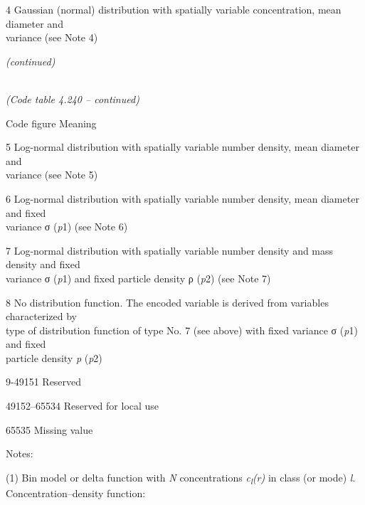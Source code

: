 4 Gaussian (normal) distribution with spatially variable concentration, mean diameter and\\
variance (see Note 4)

\emph{(continued)}

\emph{\\
(Code table 4.240 -- continued)}

Code figure Meaning

5 Log-normal distribution with spatially variable number density, mean diameter and\\
variance (see Note 5)

6 Log-normal distribution with spatially variable number density, mean diameter and fixed\\
variance σ (\emph{p}1) (see Note 6)

7 Log-normal distribution with spatially variable number density and mass density and fixed\\
variance σ (\emph{p}1) and fixed particle density ρ (\emph{p}2) (see Note 7)

8 No distribution function. The encoded variable is derived from variables characterized by\\
type of distribution function of type No. 7 (see above) with fixed variance σ (\emph{p}1) and fixed\\
particle density \emph{p} (\emph{p}2)

9-49151 Reserved

49152--65534 Reserved for local use

65535 Missing value

Notes:

(1) Bin model or delta function with \emph{N} concentrations \emph{c\textsubscript{l}(r)} in class (or mode) \emph{l}.\\
Concentration--density function:

